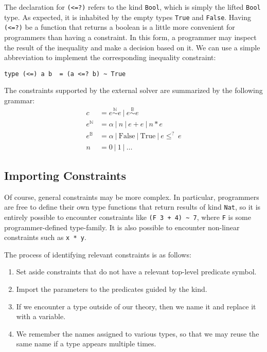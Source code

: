 \documentclass{sigplanconf}
\begin{document}
The declaration for \Verb"(<=?)" refers to the kind \Verb"Bool", which
is simply the lifted \Verb"Bool" type.  As expected, it is inhabited by the
empty types \Verb"True" and \Verb"False".   Having \Verb"(<=?)" be a function
that returns a boolean is a little more convenient for programmers than having
a constraint. In this form, a programmer may inspect the result of the
inequality and make a decision based on it.  We can use a simple
abbreviation to implement the corresponding inequality constraint:
\begin{Verbatim}
type (<=) a b  = (a <=? b) ~ True
\end{Verbatim}

The constraints supported by the external solver are summarized by the
following grammar:
\begin{align*}
c & = e \overset {\mathbb{N}} \sim e ~|~  e \overset {\mathbb{B}} \sim e \\
e^\mathbb{N} & = \alpha ~|~ n ~|~ e + e ~|~ n * e \\
e^\mathbb{B} & = \alpha ~|~ \mathrm{False} ~|~ \mathrm{True} ~|~ e \leq^? ~e \\
n          & = 0 ~|~ 1 ~|~ \dots
\end{align*}


\subsection{Importing Constraints}

Of course, general constraints may be more complex.  In particular,
programmers are free to define their own type functions that return
results of kind \Verb"Nat", so it is entirely possible to encounter
constraints like \Verb"(F 3 + 4) ~ 7", where \Verb"F" is some programmer-defined
type-family.  It is also possible to encounter non-linear constraints such
as \Verb"x * y".

The process of identifying relevant constraints is as follows:
\begin{enumerate}
\item Set aside constraints that do not have a relevant top-level predicate
symbol.
\item Import the parameters to the predicates guided by the kind.
\item If we encounter a type outside of our theory, then we name it and replace
      it with a variable.
\item We remember the names assigned to various types, so that we may reuse
      the same name if a type appears multiple times.
\end{enumerate}
\end{document}
